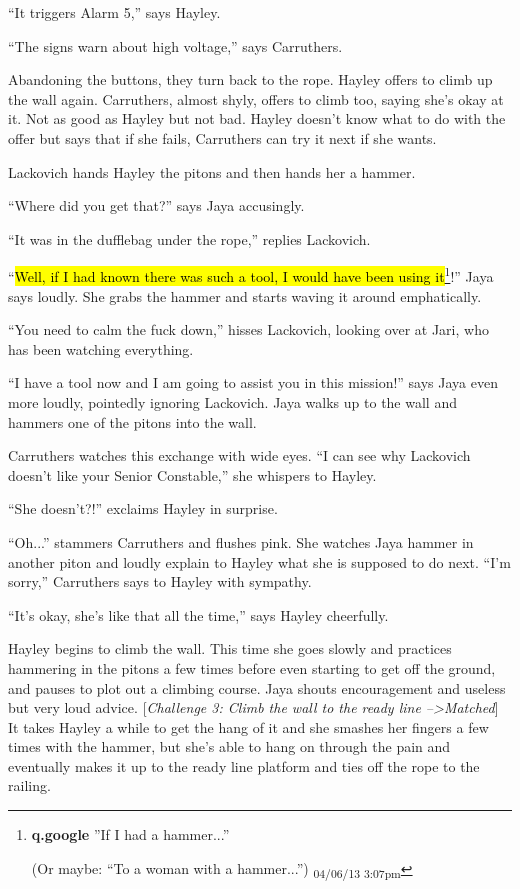``It triggers Alarm 5,'' says Hayley.

``The signs warn about high voltage,'' says Carruthers.

Abandoning the buttons, they turn back to the rope.  Hayley offers to climb up the wall again.  Carruthers, almost shyly, offers to climb too, saying she's okay at it.  Not as good as Hayley but not bad.  Hayley doesn't know what to do with the offer but says that if she fails, Carruthers can try it next if she wants.



Lackovich hands Hayley the pitons and then hands her a hammer.  

``Where did you get that?'' says Jaya accusingly.  

``It was in the dufflebag under the rope,'' replies Lackovich.

``\hl{Well, if I had known there was such a tool, I would have been using it}\footnote{\textbf{q.google }''If I had a hammer...''

(Or maybe: ``To a woman with a hammer...'') \textsubscript{04/06/13 3:07pm}}!'' Jaya says loudly. She grabs the hammer and starts waving it around emphatically.

``You need to calm the fuck down,'' hisses Lackovich, looking over at Jari, who has been watching everything.

``I have a tool now and I am going to assist you in this mission!'' says Jaya even more loudly, pointedly ignoring Lackovich.  Jaya walks up to the wall and hammers one of the pitons into the wall.



Carruthers watches this exchange with wide eyes.  ``I can see why Lackovich doesn't like your Senior Constable,'' she whispers to Hayley.

``She doesn't?!'' exclaims Hayley in surprise.

``Oh...'' stammers Carruthers and flushes pink.  She watches Jaya hammer in another piton and loudly explain to Hayley what she is supposed to do next.  ``I'm sorry,'' Carruthers says to Hayley with sympathy.

``It's okay, she's like that all the time,'' says Hayley cheerfully.



Hayley begins to climb the wall.  This time she goes slowly and practices hammering in the pitons a few times before even starting to get off the ground, and pauses to plot out a climbing course.  Jaya shouts encouragement and useless but very loud advice.  {[}\textit{Challenge 3: Climb the wall to the ready line --\textgreater  Matched}{]}  It takes Hayley a while to get the hang of it and she smashes her fingers a few times with the hammer, but she's able to hang on through the pain and eventually makes it up to the ready line platform and ties off the rope to the railing.



